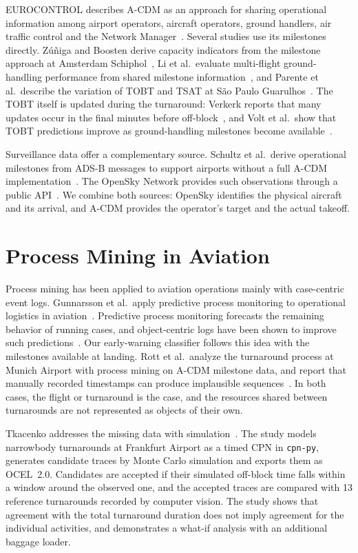 EUROCONTROL describes A-CDM as an approach for sharing operational information among airport operators, aircraft operators, ground handlers, air traffic control and the Network Manager~\cite{eurocontrol_acdm}. Several studies use its milestones directly. Z\'u\~niga and Boosten derive capacity indicators from the milestone approach at Amsterdam Schiphol~\cite{zuniga2020cdm}, Li et al.\ evaluate multi-flight ground-handling performance from shared milestone information~\cite{li2022multiflight}, and Parente et al.\ describe the variation of TOBT and TSAT at S\~ao Paulo Guarulhos~\cite{parente2024guarulhos}. The TOBT itself is updated during the turnaround: Verkerk reports that many updates occur in the final minutes before off-block~\cite{verkerk2018tobt}, and Volt et al.\ show that TOBT predictions improve as ground-handling milestones become available~\cite{volt2026tobt}.

Surveillance data offer a complementary source. Schultz et al.\ derive operational milestones from ADS-B messages to support airports without a full A-CDM implementation~\cite{schultz2019acdmlite,schultz2021adsb}. The OpenSky Network provides such observations through a public API~\cite{opensky_rest}. We combine both sources: OpenSky identifies the physical aircraft and its arrival, and A-CDM provides the operator's target and the actual takeoff.

\section{Process Mining in Aviation}

Process mining has been applied to aviation operations mainly with case-centric event logs. Gunnarsson et al.\ apply predictive process monitoring to operational logistics in aviation~\cite{gunnarsson2019ppm}. Predictive process monitoring forecasts the remaining behavior of running cases, and object-centric logs have been shown to improve such predictions~\cite{fioretto2025ppm}. Our early-warning classifier follows this idea with the milestones available at landing. Rott et al.\ analyze the turnaround process at Munich Airport with process mining on A-CDM milestone data, and report that manually recorded timestamps can produce implausible sequences~\cite{rott2023processmining}. In both cases, the flight or turnaround is the case, and the resources shared between turnarounds are not represented as objects of their own.

Tkacenko addresses the missing data with simulation~\cite{tkacenko2026}. The study models narrowbody turnarounds at Frankfurt Airport as a timed CPN in \texttt{cpn-py}, generates candidate traces by Monte Carlo simulation and exports them as OCEL~2.0. Candidates are accepted if their simulated off-block time falls within a window around the observed one, and the accepted traces are compared with 13 reference turnarounds recorded by computer vision. The study shows that agreement with the total turnaround duration does not imply agreement for the individual activities, and demonstrates a what-if analysis with an additional baggage loader.

